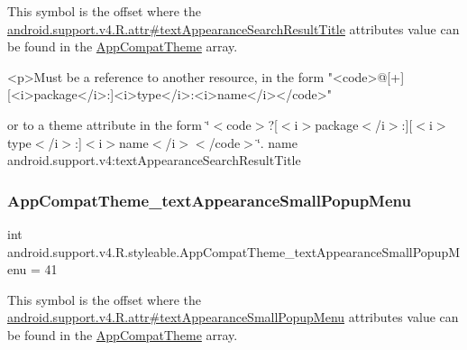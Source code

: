 This symbol is the offset where the \hyperlink{classandroid_1_1support_1_1v4_1_1R_1_1attr_a4b4c9e0256dc86743a3c07371ce817bd}{android.\+support.\+v4.\+R.\+attr\#text\+Appearance\+Search\+Result\+Title} attribute\textquotesingle{}s value can be found in the \hyperlink{classandroid_1_1support_1_1v4_1_1R_1_1styleable_ac07ebbe62ed977f6dcaadc6397840ace}{App\+Compat\+Theme} array.

\begin{DoxyVerb}      <p>Must be a reference to another resource, in the form "<code>@[+][<i>package</i>:]<i>type</i>:<i>name</i></code>"
\end{DoxyVerb}
 or to a theme attribute in the form \char`\"{}$<$code$>$?\mbox{[}$<$i$>$package$<$/i$>$\+:\mbox{]}\mbox{[}$<$i$>$type$<$/i$>$\+:\mbox{]}$<$i$>$name$<$/i$>$$<$/code$>$\char`\"{}.  name android.\+support.\+v4\+:text\+Appearance\+Search\+Result\+Title \mbox{\label{classandroid_1_1support_1_1v4_1_1R_1_1styleable_a75e7751d6580449963f139fd3c4efd52}} 
\subsubsection{\texorpdfstring{App\+Compat\+Theme\+\_\+text\+Appearance\+Small\+Popup\+Menu}{AppCompatTheme\_textAppearanceSmallPopupMenu}}
{\footnotesize\ttfamily int android.\+support.\+v4.\+R.\+styleable.\+App\+Compat\+Theme\+\_\+text\+Appearance\+Small\+Popup\+Menu = 41\hspace{0.3cm}{\ttfamily [static]}}

This symbol is the offset where the \hyperlink{classandroid_1_1support_1_1v4_1_1R_1_1attr_aac7597ce08870b189e08a6fdb490bccf}{android.\+support.\+v4.\+R.\+attr\#text\+Appearance\+Small\+Popup\+Menu} attribute\textquotesingle{}s value can be found in the \hyperlink{classandroid_1_1support_1_1v4_1_1R_1_1styleable_ac07ebbe62ed977f6dcaadc6397840ace}{App\+Compat\+Theme} array.


